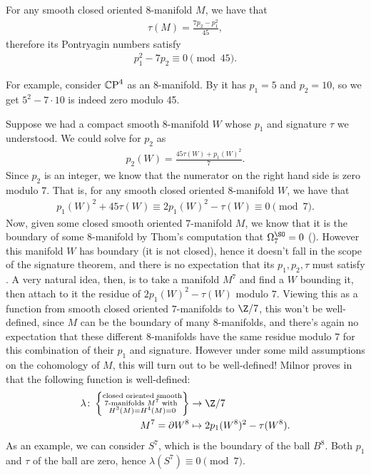 \documentclass[11pt]{book}
\begin{document}
\begin{example} For any smooth closed oriented $8$-manifold $M$, we have that
\begin{align*}
    \tau(M) = \frac{7p_2 - p_1^2}{45},
\end{align*}
therefore its Pontryagin numbers satisfy
\begin{align*}
    p_1^2 - 7p_2 \equiv 0 \pmod{45}.
\end{align*}
\end{example}

For example, consider ${\mathbb{C}\text{P}}^4$ as an 8-manifold. By  it has $p_1 =5$ and $p_2 = 10$, so we get $5^2 - 7\cdot 10$ is indeed zero modulo 45.

\begin{example} Suppose we had a compact smooth 8-manifold $W$ whose $p_1$ and signature $\tau$ we understood. We could solve for $p_2$ as
\begin{align*}
    p_2(W) = \frac{45\tau(W) + p_1(W)^2}{7}.
\end{align*}
%
Since $p_2$ is an integer, we know that the numerator on the right hand side is zero modulo 7. That is, for any smooth closed oriented $8$-manifold $W$, we have that
\begin{equation}\label{eqn:p2-mod-7-for-8-manifolds}
\begin{aligned}
    p_1(W)^2 + 45\tau(W) \equiv 2p_1(W)^2 - \tau(W) \equiv 0 \pmod{7}.
\end{aligned}
\end{equation}
%
Now, given some closed smooth oriented $7$-manifold $M$, we know that it is the boundary of some $8$-manifold by Thom's computation that $\Omega_7^\SO = 0$ (). However this manifold $W$ has boundary (it is not closed), hence it doesn't fall in the scope of the signature theorem, and there is no expectation that its $p_1,p_2,\tau$ must satisfy . A very natural idea, then, is to take a manifold $M^7$ and find a $W$ bounding it, then attach to it the residue of $2p_1(W)^2 - \tau(W)$ modulo $7$. Viewing this as a function from smooth closed oriented $7$-manifolds to $\Z/7$, this won't be well-defined, since $M$ can be the boundary of many $8$-manifolds, and there's again no expectation that these different $8$-manifolds have the same residue modulo $7$ for this combination of their $p_1$ and signature. However under some mild assumptions on the cohomology of $M$, this will turn out to be well-defined! Milnor proves in \cite[Theorem~1]{milnorManifoldsHomeomorphic7Sphere1956} that the following function is well-defined:
\begin{align*}
    \lambda \colon \left\{ \substack{\text{closed oriented smooth} \\ \text{7-manifolds }M^7 \text{ with }\\ H^3(M) = H^4(M)=0} \right\} &\to \Z/7 \\
    M^7 = \del W^8 &\mapsto 2p_1(W^8)^2 - \tau(W^8).
\end{align*}
%
As an example, we can consider $S^7$, which is the boundary of the ball $B^8$. Both $p_1$ and $\tau$ of the ball are zero, hence $\lambda(S^7) \equiv 0 \pmod{7}$.


\end{example}
\end{document}
